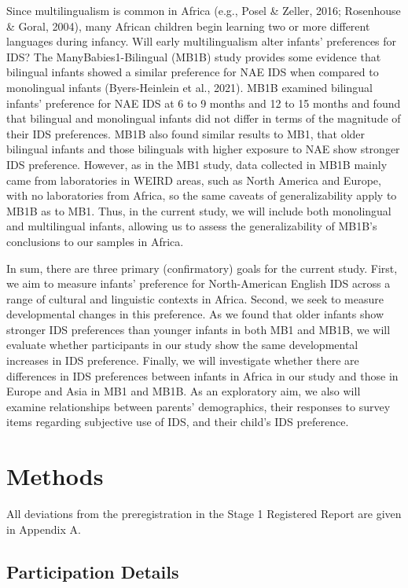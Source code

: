 \documentclass[
  ,man,floatsintext]{apa6}
\begin{document}
Since multilingualism is common in Africa (e.g., Posel \& Zeller, 2016; Rosenhouse \& Goral, 2004), many African children begin learning two or more different languages during infancy. Will early multilingualism alter infants' preferences for IDS? The ManyBabies1-Bilingual (MB1B) study provides some evidence that bilingual infants showed a similar preference for NAE IDS when compared to monolingual infants (Byers-Heinlein et al., 2021). MB1B examined bilingual infants' preference for NAE IDS at 6 to 9 months and 12 to 15 months and found that bilingual and monolingual infants did not differ in terms of the magnitude of their IDS preferences. MB1B also found similar results to MB1, that older bilingual infants and those bilinguals with higher exposure to NAE show stronger IDS preference. However, as in the MB1 study, data collected in MB1B mainly came from laboratories in WEIRD areas, such as North America and Europe, with no laboratories from Africa, so the same caveats of generalizability apply to MB1B as to MB1. Thus, in the current study, we will include both monolingual and multilingual infants, allowing us to assess the generalizability of MB1B's conclusions to our samples in Africa.

In sum, there are three primary (confirmatory) goals for the current study. First, we aim to measure infants' preference for North-American English IDS across a range of cultural and linguistic contexts in Africa. Second, we seek to measure developmental changes in this preference. As we found that older infants show stronger IDS preferences than younger infants in both MB1 and MB1B, we will evaluate whether participants in our study show the same developmental increases in IDS preference. Finally, we will investigate whether there are differences in IDS preferences between infants in Africa in our study and those in Europe and Asia in MB1 and MB1B. As an exploratory aim, we also will examine relationships between parents' demographics, their responses to survey items regarding subjective use of IDS, and their child's IDS preference.

\hypertarget{methods}{%
\section{Methods}\label{methods}}

All deviations from the preregistration in the Stage 1 Registered Report are given in Appendix A.

\hypertarget{participation-details}{%
\subsection{Participation Details}\label{participation-details}}
\end{document}
